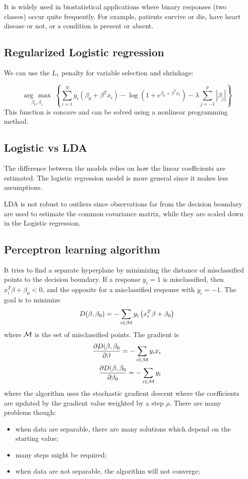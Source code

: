 \documentclass[12pt, letterpaper]{article}
\theoremstyle{definition}
\newcommand{\argmax}[1]{\underset{#1}{\operatorname{arg}\,\operatorname{max}}\;}
\begin{document}
It is widely used in biostatistical applications where binary responses (two classes) occur quite frequently. For example, patients survive or die, have heart disease or not, or a condition is present or absent.
\subsection{Regularized Logistic regression}
We can use the $L_1$ penalty for variable selection and shrinkage:

\begin{equation}
\argmax{\beta_0,\beta_1} \left\lbrace \sum_{i=1}^N y_i\left(  \beta_0 + \beta^Tx_i\right) -\log \left( 1+e^{\beta_0 + \beta^T x_i}\right) -\lambda \sum_{j=-1}^p |\beta_j|\right\rbrace
\end{equation}
This function is concave and can be solved using a nonlinear programming method.
\subsection{Logistic vs LDA}
The difference between the models relies on how the linear coefficients are estimated. The logistic regression model is more general since it makes less assumptions.

LDA is not robust to outliers since observations far from the decision boundary are used to estimate the common covariance matrix, while they are scaled down in the Logistic regression.

\subsection{Perceptron learning algorithm}
It tries to find a separate hyperplane by minimizing the distance of misclassified points to the decision boundary. If a response $y_i = 1$ is misclassified, then $x^T_i \beta + \beta_0 < 0$, and the opposite for a misclassified response with $y_i = -1$. The goal is to minimize
\begin{equation}
D(\beta, \beta_0) = - \sum_{i\in\CMcal{M}} y_i\left(x_i^T\beta + \beta_0\right)
\end{equation}
where $\CMcal{M}$ is the set of misclassified points.
The gradient is
\begin{align}
\frac{\partial D(\beta,\beta_0}{\partial \beta} = -\sum_{i\in\CMcal{M}}y_ix_i \\
\frac{\partial D(\beta,\beta_0}{\partial \beta_0} = -\sum_{i\in\CMcal{M}} y_i
\end{align}
where the algorithm uses the stochastic gradient descent where the coefficients are updated by the gradient value weighted by a step $\rho$. There are many problems though:
\begin{itemize}
\item when data are separable, there are many solutions which depend on the starting value;
\item many steps might be required;
\item when data are not separable, the algorithm will not converge;
\end{itemize}
\end{document}
